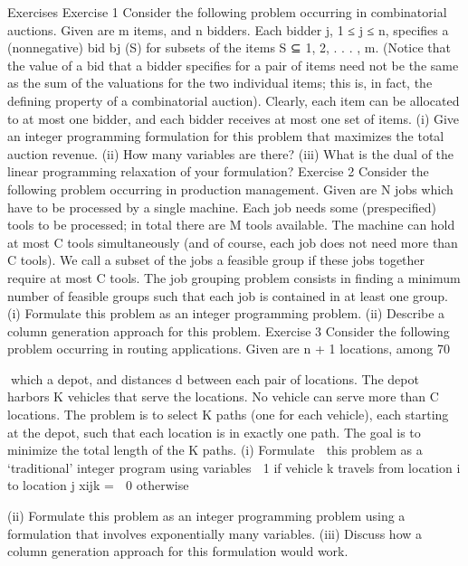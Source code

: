 Exercises
Exercise 1
Consider the following problem occurring in combinatorial auctions. Given are m items, and n bidders.
Each bidder j, 1 ≤ j ≤ n, specifies a (nonnegative) bid bj (S) for subsets of the items S ⊆ {1, 2, . . . , m}.
(Notice that the value of a bid that a bidder specifies for a pair of items need not be the same as the sum
of the valuations for the two individual items; this is, in fact, the defining property of a combinatorial
auction). Clearly, each item can be allocated to at most one bidder, and each bidder receives at most
one set of items.
(i) Give an integer programming formulation for this problem that maximizes the total auction revenue.
(ii) How many variables are there?
(iii) What is the dual of the linear programming relaxation of your formulation?
Exercise 2
Consider the following problem occurring in production management. Given are N jobs which have to be
processed by a single machine. Each job needs some (prespecified) tools to be processed; in total there
are M tools available. The machine can hold at most C tools simultaneously (and of course, each job
does not need more than C tools). We call a subset of the jobs a feasible group if these jobs together
require at most C tools. The job grouping problem consists in finding a minimum number of feasible
groups such that each job is contained in at least one group.
(i) Formulate this problem as an integer programming problem.
(ii) Describe a column generation approach for this problem.
Exercise 3
Consider the following problem occurring in routing applications. Given are n + 1 locations, among
70

which a depot, and distances d between each pair of locations. The depot harbors K vehicles that serve
the locations. No vehicle can serve more than C locations. The problem is to select K paths (one for
each vehicle), each starting at the depot, such that each location is in exactly one path. The goal is to
minimize the total length of the K paths.
(i) Formulate
 this problem as a ‘traditional' integer program using variables
 1 if vehicle k travels from location i to location j
xijk =
 0 otherwise

(ii) Formulate this problem as an integer programming problem using a formulation that involves
exponentially many variables.
(iii) Discuss how a column generation approach for this formulation would work.